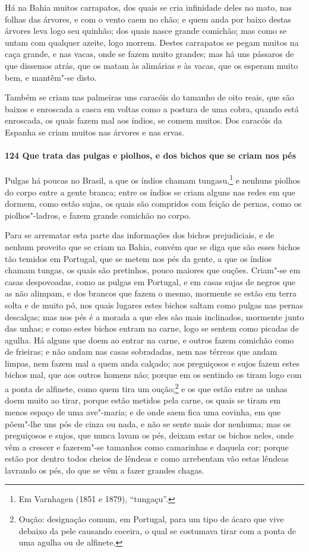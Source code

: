 Há na Bahia muitos carrapatos, dos quais se cria infinidade deles no mato, nas folhas das
árvores, e com o vento caem no chão; e quem anda por baixo destas árvores leva logo seu
quinhão; dos quais nasce grande comichão; mas como se untam com qualquer azeite, logo
morrem. Destes carrapatos se pegam muitos na caça grande, e nas vacas, onde se fazem muito
grandes; mas há uns pássaros de que dissemos atrás, que os matam às alimárias e às vacas,
que os esperam muito bem, e mantêm"-se disto.

Também se criam nas palmeiras uns caracóis do tamanho de oito reais, que são baixos e
enroscada a casca em voltas como a postura de uma cobra, quando está enroscada, os quais
fazem mal aos índios, se comem muitos. Dos caracóis da Espanha se criam muitos nas árvores
e nas ervas.

\paragraph{124 Que trata das pulgas e piolhos, e dos bichos que se criam nos pés}

Pulgas há poucas no Brasil, a que os índios chamam tungasu,\footnote{ Em Varnhagen (1851 e
1879), ``tungaçu''.} e nenhuns piolhos do corpo entre a gente branca; entre os índios se
criam alguns nas redes em que dormem, como estão sujas, os quais são compridos com feição
de pernas, como os piolhos"-ladros, e fazem grande comichão no corpo.

Para se arrematar esta parte das informações dos bichos prejudiciais, e de nenhum proveito
que se criam na Bahia, convém que se diga que são esses bichos tão temidos em Portugal,
que se metem nos pés da gente, a que os índios chamam tungas, os quais são pretinhos,
pouco maiores que ouções. Criam"-se em casas despovoadas, como as pulgas em Portugal, e em
casas sujas de negros que as não alimpam, e dos brancos que fazem o mesmo, mormente se
estão em terra solta e de muito pó, nos quais lugares estes bichos saltam como pulgas nas
pernas descalças; mas nos pés é a morada a que eles são mais inclinados, mormente junto
das unhas; e como estes bichos entram na carne, logo se sentem como picadas de agulha. Há
alguns que doem ao entrar na carne, e outros fazem comichão como de frieiras; e não andam
nas casas sobradadas, nem nas térreas que andam limpas, nem fazem mal a quem anda calçado;
aos preguiçosos e sujos fazem estes bichos mal, que aos outros homens não; porque em os
sentindo os tiram logo com a ponta de alfinete, como quem tira um oução;\footnote{ Oução:
designação comum, em Portugal, para um tipo de ácaro que vive debaixo da pele causando
coceira, o qual se costumava tirar com a ponta de uma agulha ou de alfinete.} e os que
estão entre as unhas doem muito ao tirar, porque estão metidos pela carne, os quais se
tiram em menos espaço de uma ave"-maria; e de onde saem fica uma covinha, em que põem"-lhe
uns pós de cinza ou nada, e não se sente mais dor nenhuma; mas os preguiçosos e sujos, que
nunca lavam os pés, deixam estar os bichos neles, onde vêm a crescer e fazerem"-se tamanhos
como camarinhas e daquela cor; porque estão por dentro todos cheios de lêndeas e como
arrebentam vão estas lêndeas lavrando os pés, do que se vêm a fazer grandes chagas.

